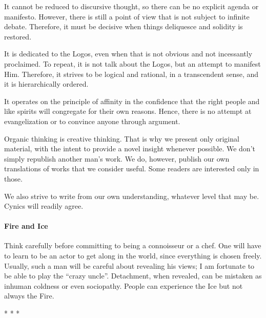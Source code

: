 It cannot be reduced to discursive thought, so there can be no explicit agenda or manifesto. However, there is still a point of view that is not subject to infinite debate. Therefore, it must be decisive when things deliquesce and solidity is restored.

It is dedicated to the Logos, even when that is not obvious and not incessantly proclaimed. To repeat, it is not talk about the Logos, but an attempt to manifest Him. Therefore, it strives to be logical and rational, in a transcendent sense, and it is hierarchically ordered.

It operates on the principle of affinity in the confidence that the right people and like spirits will congregate for their own reasons. Hence, there is no attempt at evangelization or to convince anyone through argument.

Organic thinking is creative thinking. That is why we present only original material, with the intent to provide a novel insight whenever possible. We don't simply republish another man's work. We do, however, publish our own translations of works that we consider useful. Some readers are interested only in those.

We also strive to write from our own understanding, whatever level that may be. Cynics will readily agree.

\paragraph{Fire and Ice}


Think carefully before committing to being a connoisseur or a chef. One will have to learn to be an actor to get along in the world, since everything is chosen freely. Usually, such a man will be careful about revealing his views; I am fortunate to be able to play the ``crazy uncle''. Detachment, when revealed, can be mistaken as inhuman coldness or even sociopathy. People can experience the Ice but not always the Fire.



\begin{center}* * *\end{center}

